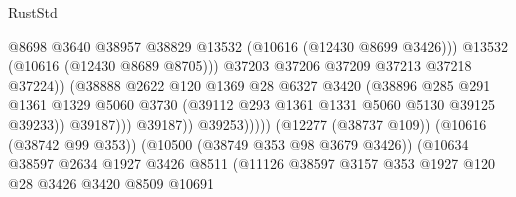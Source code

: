 \begin{lexlean}{RustStd}
\begin{coremodule}
                                                    @8698
                                                    @3640
                                                    @38957
                                                    @38829
                                                    @13532
                                                    (@10616 (@12430 @8699 @3426)))
                                                  @13532
                                                  (@10616 (@12430 @8689 @8705)))
                                                @37203
                                                @37206
                                                @37209
                                                @37213
                                                @37218
                                                @37224))
                                            (@38888
                                              @2622
                                              @120
                                              @1369
                                              @28
                                              @6327
                                              @3420
                                              (@38896
                                                @285
                                                @291
                                                @1361
                                                @1329
                                                @5060
                                                @3730
                                                (@39112 @293 @1361 @1331 @5060 @5130 @39125 @39233))
                                              @39187)))
                                        @39187))
                                    @39253)))))
                          (@12277 (@38737 @109))
                          (@10616 (@38742 @99 @353))
                          (@10500 (@38749 @353 @98 @3679 @3426))
                          (@10634
                            @38597
                            @2634
                            @1927
                            @3426
                            @8511
                            (@11126
                              @38597
                              @3157
                              @353
                              @1927
                              @120
                              @28
                              @3426
                              @3420
                              @8509
                              @10691

\end{coremodule}
\end{lexlean}
